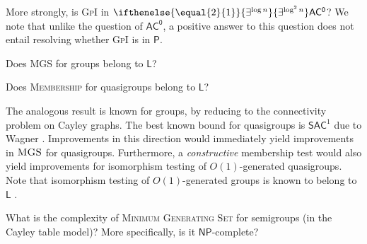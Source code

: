 \documentclass{theoretics}
\newcommand{\algprobm}[1]{\textsc{#1}\xspace}
\newcommand{\betacc}[1]{\ifthenelse{\equal{#1}{1}}{\exists^{\log n}}{\exists^{\log^{#1}n}}} %
\newcommand*{\ComplexityClass}[1]{\ensuremath{\mathsf{#1}}\xspace}
\newcommand*{\NP}{\ComplexityClass{NP}}
\renewcommand{\P}{\ComplexityClass{P}}
\newcommand*{\LogSpace}{\ComplexityClass{L}}
\newcommand{\SAC}{\ComplexityClass{SAC}}
\newcommand{\ACz}{\ComplexityClass{AC^0}}
\begin{document}
More strongly, is \algprobm{GpI} in $\betacc{2}\ACz$? We note that unlike the question of $\ACz$, a positive answer to this question does not entail resolving whether \algprobm{GpI} is in $\P$.

\begin{question}
Does \algprobm{MGS} for groups belong to $\LogSpace$?
\end{question}


\begin{question}
Does \algprobm{Membership} for quasigroups belong to $\LogSpace$?
\end{question}

The analogous result is known for groups, by reducing to the connectivity problem on Cayley graphs. The best known bound for quasigroups is $\SAC^{1}$ due to Wagner \cite{WagnerThesis}. Improvements in this direction would immediately yield improvements in $\algprobm{MGS}$ for quasigroups. Furthermore, a \textit{constructive} membership test would also yield improvements for isomorphism testing of $O(1)$-generated quasigroups. Note that isomorphism testing of $O(1)$-generated groups is known to belong to $\LogSpace$ \cite{TangThesis}.

\begin{question}
What is the complexity of \algprobm{Minimum Generating Set} for semigroups (in the Cayley table model)? More specifically, is it \NP-complete?
\end{question}






\printbibliography
\end{document}
